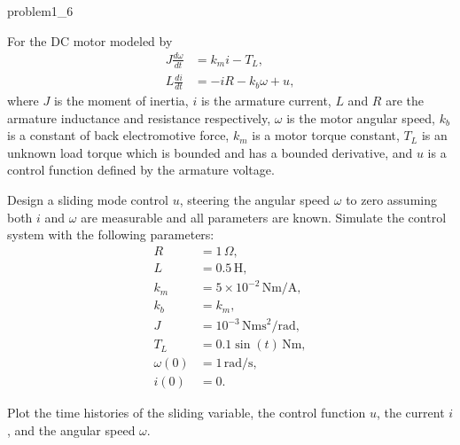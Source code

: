 \begin{problem}{1.6}{problem1_6}

For the DC motor modeled by
\begin{equation}
	\begin{aligned}
		J\frac{d\omega}{dt} & = k_m i - T_L,          \\
		L\frac{di}{dt}      & = -iR - k_b \omega + u,
	\end{aligned}
	\label{eq:dcmotor}
\end{equation}
where \( J \) is the moment of inertia, \( i \) is the armature current, \( L \) and \( R \) are the armature inductance and resistance respectively, \( \omega \) is the motor angular speed, \( k_b \) is a constant of back electromotive force, \( k_m \) is a motor torque constant, \( T_L \) is an unknown load torque which is bounded and has a bounded derivative, and \( u \) is a control function defined by the armature voltage.

Design a sliding mode control \( u \), steering the angular speed \( \omega \) to zero assuming both \( i \) and \( \omega \) are measurable and all parameters are known. Simulate the control system with the following parameters:
\[
	\begin{aligned}
		R         & = 1\,\Omega,                        \\
		L         & = 0.5\,\text{H},                    \\
		k_m       & = 5 \times 10^{-2}\,\text{Nm/A},    \\
		k_b       & = k_m,                              \\
		J         & = 10^{-3}\,\text{Nms}^2/\text{rad}, \\
		T_L       & = 0.1 \sin(t)\,\text{Nm},           \\
		\omega(0) & = 1\,\text{rad/s},                  \\
		i(0)      & = 0.
	\end{aligned}
\]

Plot the time histories of the sliding variable, the control function \( u \), the current \( i \), and the angular speed \( \omega \).

\end{problem}

